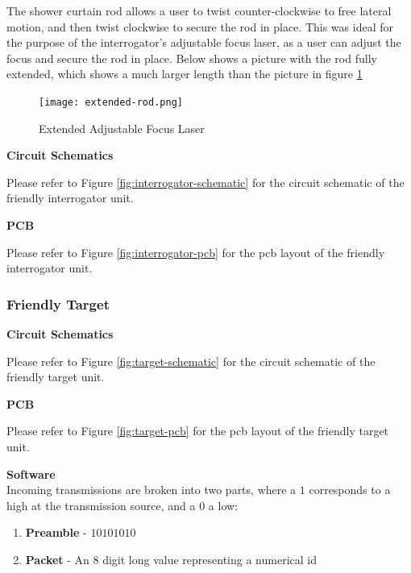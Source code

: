 \documentclass[letterpaper,10pt]{article}
\begin{document}
\begin{spacing}{1.15}
The shower curtain rod allows a user to twist counter-clockwise to free lateral motion, and then twist clockwise to secure the rod in place. This was ideal for the purpose of the interrogator's adjustable focus laser, as a user can adjust the focus and secure the rod in place. Below shows a picture with the rod fully extended, which shows a much larger length than the picture in figure \ref{fig:extended}

\begin{figure} [H]
	\centering
	\texttt{[image: extended-rod.png]}
	\label{fig:extended}
	\caption{Extended Adjustable Focus Laser}
\end{figure}

\hspace{5mm}\textbf{Circuit Schematics} \label{section:interrogator-circuit-schematics-design-details}

Please refer to Figure \ref{fig:interrogator-schematic} for the circuit schematic of the friendly interrogator unit. 

\hspace{5mm}\textbf{PCB} \label{section:interrogator-pcb-design-details}

Please refer to Figure \ref{fig:interrogator-pcb} for the pcb layout of the friendly interrogator unit. 



\subsubsection{Friendly Target}
\hspace{5mm}\textbf{Circuit Schematics} \label{section:target-circuit-schematics-design-details}

Please refer to Figure \ref{fig:target-schematic} for the circuit schematic of the friendly target unit. 

\hspace{5mm}\textbf{PCB} \label{section:target-pcb-design-details}

Please refer to Figure \ref{fig:target-pcb} for the pcb layout of the friendly target unit. 

\hspace{5mm} \textbf{Software} \label{section:target-software-design-details}\\
Incoming transmissions are broken into two parts, where a $1$ corresponds to a high at the transmission source, and a $0$ a low: 
\begin{enumerate}
	\small
	\item \textbf{Preamble} - $10101010$ 
	\item \textbf{Packet} - An 8 digit long value representing a numerical id
\end{enumerate}



\end{spacing}
\end{document}
